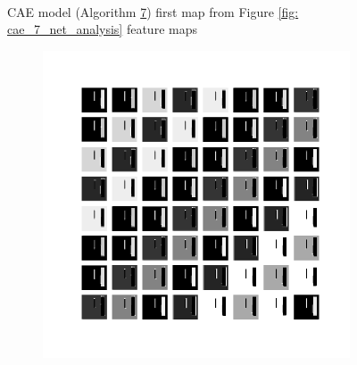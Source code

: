 \begin{figure}
\begin{subfigure}[b]{0.40\linewidth}
    \end{subfigure}
    \\[-0.5cm]
    \caption{CAE model (Algorithm \hyperref[tab: app_evalalgorithms]{7}) first map from Figure \ref{fig: cae_7_net_analysis} feature maps}
    \label{fig: cae_7_feature_maps_1}
\end{figure}

\begin{figure}
    \centering
    \begin{subfigure}[b]{0.4\linewidth}
        \includegraphics[width=\linewidth]{images/cae_online_lstm/caelstm_section_cae_training_block_map_10000_model_feature_maps_map_1_0_3.png}
    \end{subfigure}
    \hfill
    \begin{subfigure}[b]{0.4\linewidth}

\end{subfigure}
\end{figure}
